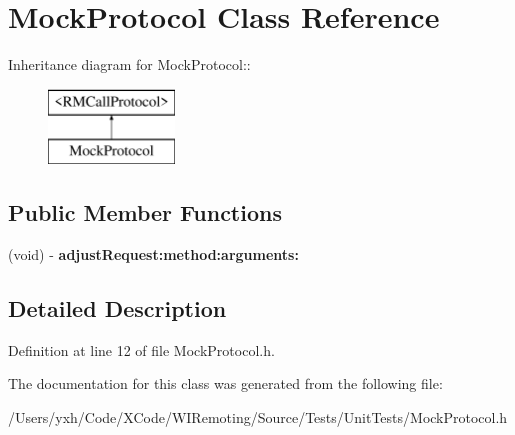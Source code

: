 \hypertarget{interface_mock_protocol}{
\section{MockProtocol Class Reference}
\label{interface_mock_protocol}
}
Inheritance diagram for MockProtocol::\begin{figure}[H]
\begin{center}
\leavevmode
\includegraphics[height=2cm]{interface_mock_protocol}
\end{center}
\end{figure}
\subsection*{Public Member Functions}
\begin{DoxyCompactItemize}
\item 
\hypertarget{interface_mock_protocol_af1dbb6f419ecd6fe8cb3f73e2dee276b}{
(void) -\/ {\bfseries adjustRequest:method:arguments:}}
\label{interface_mock_protocol_af1dbb6f419ecd6fe8cb3f73e2dee276b}

\end{DoxyCompactItemize}


\subsection{Detailed Description}


Definition at line 12 of file MockProtocol.h.

The documentation for this class was generated from the following file:\begin{DoxyCompactItemize}
\item 
/Users/yxh/Code/XCode/WIRemoting/Source/Tests/UnitTests/MockProtocol.h\end{DoxyCompactItemize}
